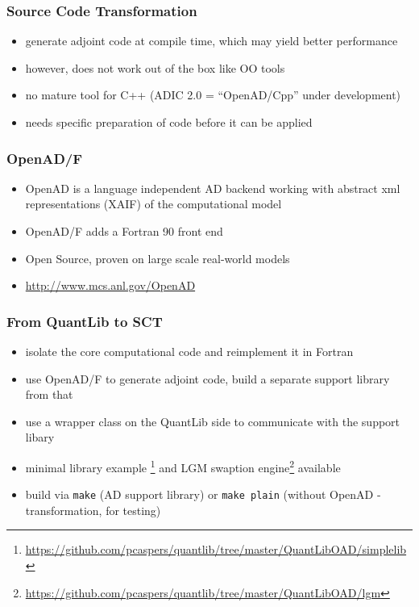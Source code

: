 \documentclass[10pt,German]{beamer}
\begin{document}
\begin{frame}[fragile]
\frametitle{Source Code Transformation}
\begin{itemize}
\item generate adjoint code at compile time, which may yield better performance
\item however, does not work out of the box like OO tools
\item no mature tool for C++ (ADIC 2.0 = ``OpenAD/Cpp'' under development)
\item needs specific preparation of code before it can be applied
\end{itemize}
\end{frame}

\begin{frame}[fragile]
\frametitle{OpenAD/F}
\begin{itemize}
\item OpenAD is a language independent AD backend working with abstract xml representations (XAIF) of the computational model
\item OpenAD/F adds a Fortran 90 front end
\item Open Source, proven on large scale real-world models
\item \url{http://www.mcs.anl.gov/OpenAD}
\end{itemize}
\end{frame}

\begin{frame}[fragile]
\frametitle{From QuantLib to SCT}
\begin{itemize}
\item isolate the core computational code and reimplement it in Fortran
\item use OpenAD/F to generate adjoint code, build a separate support library from that
\item use a wrapper class on the QuantLib side to communicate with the support libary
\item minimal library example \footnote{\tiny\url{https://github.com/pcaspers/quantlib/tree/master/QuantLibOAD/simplelib}} and LGM swaption engine\footnote{\tiny\url{https://github.com/pcaspers/quantlib/tree/master/QuantLibOAD/lgm}} available
\item build via \verb+make+ (AD support library) or \verb+make plain+ (without OpenAD - transformation, for testing)
\end{itemize}
\end{frame}
\end{document}
